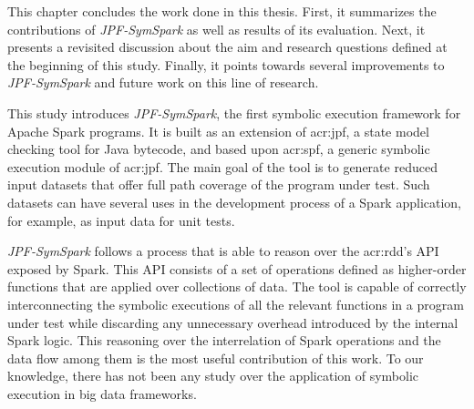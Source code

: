 
This chapter concludes the work done in this thesis. First, it summarizes the contributions of \textit{JPF-SymSpark} as well as results of its evaluation. Next, it presents a revisited discussion about the aim and research questions defined at the beginning of this study. Finally, it points towards several improvements to \textit{JPF-SymSpark} and future work on this line of research.


This study introduces \textit{JPF-SymSpark}, the first symbolic execution framework for Apache Spark programs. It is built as an extension of \acrfull{acr:jpf}, a state model checking tool for Java bytecode, and based upon \acrfull{acr:spf}, a generic symbolic execution module of \acrshort{acr:jpf}. The main goal of the tool is to generate reduced input datasets that offer full path coverage of the program under test. Such datasets can have several uses in the development process of a Spark application, for example, as input data for unit tests. 

\textit{JPF-SymSpark} follows a process that is able to reason over the \acrshort{acr:rdd}'s API exposed by Spark. This API consists of a set of operations defined as higher-order functions that are applied over collections of data. The tool is capable of correctly interconnecting the symbolic executions of all the relevant functions in a program under test while discarding any unnecessary overhead introduced by the internal Spark logic. This reasoning over the interrelation of Spark operations and the data flow among them is the most useful contribution of this work. To our knowledge, there has not been any study over the application of symbolic execution in big data frameworks.

